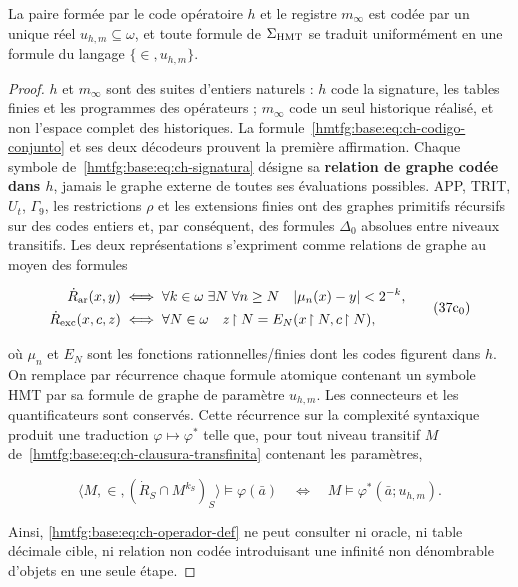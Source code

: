 \begin{lemma}
\label{hmtfg:base:thm:ch-6}
La paire formée par
le code opératoire \(h\) et le registre \(m_\infty\) est codée par un unique
réel \(u_{h,m}\subseteq\omega\), et toute formule de \(\Sigma_{\rm HMT}\) se
traduit uniformément en une formule du langage \(\{\in,u_{h,m}\}\).

\end{lemma}
\begin{proof}
\(h\) et \(m_\infty\) sont des suites d'entiers naturels : \(h\) code la signature, les tables finies et les programmes des opérateurs ; \(m_\infty\) code un seul historique réalisé, et non l'espace complet des historiques. La formule~\eqref{hmtfg:base:eq:ch-codigo-conjunto} et ses deux décodeurs prouvent la première affirmation. Chaque symbole de~\eqref{hmtfg:base:eq:ch-signatura} désigne sa \textbf{relation de graphe codée dans \(h\)}, jamais le graphe externe de toutes ses évaluations possibles. APP, TRIT, \(U_t\), \(\Gamma_9\), les restrictions \(\rho\) et les extensions finies ont des graphes primitifs récursifs sur des codes entiers et, par conséquent, des formules \(\Delta_0\) absolues entre niveaux transitifs. Les deux représentations s'expriment comme relations de graphe au moyen des formules

\[
 \begin{aligned}
 \dot R_{\rm ar}(x,y)
 &\;\Longleftrightarrow\;
 \forall k\in\omega\;\exists N\;\forall n\ge N\quad
 |\mu_n(x)-y|<2^{-k},\\
 \dot R_{\rm exc}(x,c,z)
 &\;\Longleftrightarrow\;
 \forall N\in\omega\quad z\!\upharpoonright N
   =E_N(x\!\upharpoonright N,c\!\upharpoonright N),
 \end{aligned}
\tag{37c$_0$}\label{hmtfg:base:eq:ch-grafos-publicacion}
\]

où \(\mu_n\) et \(E_N\) sont les fonctions rationnelles/finies dont les codes
figurent dans \(h\). On remplace par récurrence chaque formule atomique contenant
un symbole HMT par sa formule de graphe de paramètre \(u_{h,m}\). Les
connecteurs et les quantificateurs sont conservés. Cette récurrence sur la complexité
syntaxique produit une traduction \(\varphi\mapsto\varphi^*\) telle que, pour
tout niveau transitif \(M\) de~\eqref{hmtfg:base:eq:ch-clausura-transfinita} contenant les paramètres,

\[
 \langle M,\in,(\dot R_S\cap M^{k_S})_S\rangle
   \models\varphi(\bar a)
 \quad\Longleftrightarrow\quad
 M\models\varphi^*(\bar a;u_{h,m}).
\tag{37c}\label{hmtfg:base:eq:ch-eliminacion-uniforme}
\]

Ainsi, \eqref{hmtfg:base:eq:ch-operador-def} ne peut consulter ni oracle, ni table décimale cible, ni relation non codée introduisant une infinité non dénombrable d'objets en une seule étape.
\end{proof}

